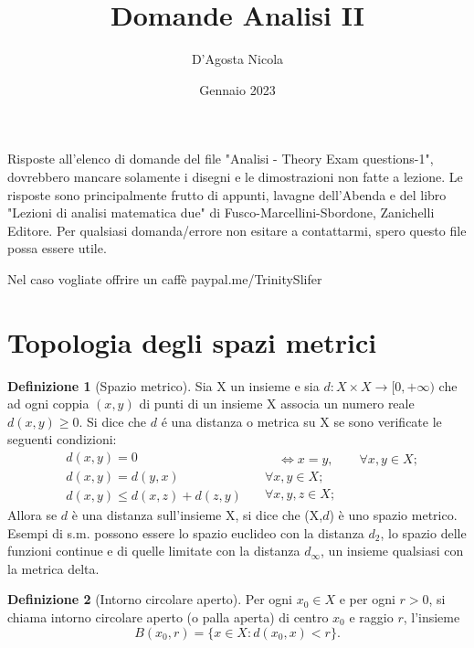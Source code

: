 \documentclass[leqno]{article}
\theoremstyle{definition}
\newtheorem{definition}{Definizione}[section]
\numberwithin{equation}{section}
\theoremstyle{remark}
\begin{document}
	
	\title{Domande Analisi II}
	\author{D'Agosta Nicola}
	\date{Gennaio 2023}
	\maketitle
	\vspace{8.0cm}
	
	
	Risposte all'elenco di domande del file "Analisi - Theory Exam questions-1", dovrebbero mancare solamente i disegni e le dimostrazioni non fatte a lezione. Le risposte sono principalmente frutto di appunti, lavagne dell'Abenda e del libro "Lezioni di analisi matematica due" di Fusco-Marcellini-Sbordone, Zanichelli Editore. Per qualsiasi domanda/errore non esitare a contattarmi, spero questo file possa essere utile. 
	
	\vspace{1.0cm}
	
	Nel caso vogliate offrire un caffè paypal.me/TrinitySlifer
	\newpage
	\tableofcontents 
	\newpage
	
	
	
	\section{Topologia degli spazi metrici}
	\begin{definition}[Spazio metrico]
		Sia X un insieme e sia $d:X\times X \rightarrow [0,+ \infty)$ che ad ogni coppia $(x,y)$ di punti di un insieme X associa un numero reale $d(x,y)\ge 0$. Si dice che $d$ é una distanza o metrica su X se sono verificate le seguenti condizioni: 
		\begin{equation} 
			\begin{split}
				&d(x,y) = 0 \\
				&d(x,y)=d(y,x)\\
				&d(x,y)\le d(x,z) + d(z,y)
			\end{split}
			\quad
			\begin{split}
				\quad \Leftrightarrow x = y, \quad \quad \forall x,y \in X; \\
				\forall x,y \in X;\\
				\forall x,y,z \in X;
			\end{split}
		\end{equation}
		Allora se $d$ è una distanza sull'insieme X, si dice che (X,$d$) è uno spazio metrico. Esempi di s.m. possono essere lo spazio euclideo con la distanza $d_2$, lo spazio delle funzioni continue e di quelle limitate con la distanza $d_\infty$, un insieme qualsiasi con la metrica delta.
	\end{definition}
	\begin{definition}[Intorno circolare aperto]
		Per ogni $x_0\in X$ e per ogni $r > 0 $, si chiama intorno circolare aperto (o palla aperta) di centro $x_0$ e raggio $r$, l'insieme
		\begin{equation}
			B(x_0,r)=\{x \in X : d(x_0,x)< r\}.
		\end{equation}
	\end{definition}
	
\end{document}
